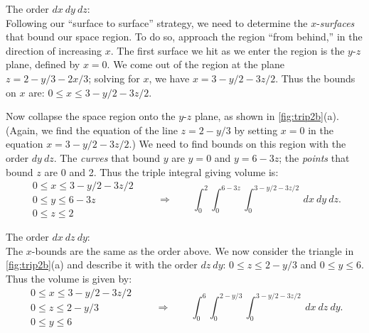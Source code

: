 {\noindent The order $dx\ dy\ dz$:\\

Following our ``surface to surface\dotso'' strategy, we need to determine the $x$-\textit{surfaces} that bound our space region. To do so, approach the region ``from behind,'' in the direction of increasing $x$. The first surface we hit as we enter the region is the $y$-$z$ plane, defined by $x=0$. We come out of the region at the plane $z=2-y/3-2x/3$; solving for $x$, we have $x= 3-y/2-3z/2$. Thus the bounds on $x$ are: $0\leq x\leq 3-y/2-3z/2$.

Now collapse the space region onto the $y$-$z$ plane, as shown in \autoref{fig:trip2b}(a). (Again, we find the equation of the line $z=2-y/3$ by setting $x=0$ in the equation $x=3-y/2-3z/2$.) We need to find bounds on this region with the order $dy\ dz$. The \textit{curves} that bound $y$ are $y=0$ and $y=6-3z$; the \textit{points} that bound $z$ are 0 and 2. Thus the triple integral giving volume is:
\[
 \begin{gathered}
  0\leq x\leq 3-y/2-3z/2\\
  0\leq y\leq 6-3z\\
  0\leq z\leq 2
 \end{gathered}
 \qquad\Rightarrow\qquad
 \int_0^2\int_0^{6-3z}\int_0^{3-y/2-3z/2}\ dx\ dy\ dz.
\]


\noindent The order $dx\ dz\ dy$:\\

The $x$-bounds are the same as the order above. We now consider the triangle in \autoref{fig:trip2b}(a) and describe it with the order $dz\ dy$: $0\leq z\leq 2-y/3$ and $0\leq y\leq 6$. Thus the volume is given by:
\[
 \begin{gathered}
  0\leq x\leq 3-y/2-3z/2\\
  0\leq z\leq 2-y/3\\
  0\leq y\leq 6
 \end{gathered}
 \qquad\Rightarrow\qquad
 \int_0^6\int_0^{2-y/3}\int_0^{3-y/2-3z/2}\ dx\ dz\ dy.
\]

}
